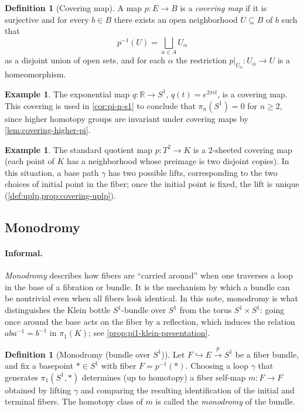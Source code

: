 \documentclass[11pt,a4paper]{article}
\theoremstyle{definition}
\newtheorem{definition}[theorem]{Definition}
\newtheorem{example}[theorem]{Example}
\theoremstyle{remark}
\begin{document}
\begin{definition}[Covering map]
\label{def:covering-map}
A map \(p:E\to B\) is a \emph{covering map} if it is surjective and for every \(b\in B\) there exists an open neighborhood \(U\subseteq B\) of \(b\) such that
\[
p^{-1}(U)=\bigsqcup_{\alpha\in A} U_\alpha
\]
as a disjoint union of open sets, and for each \(\alpha\) the restriction \(p|_{U_\alpha}:U_\alpha\to U\) is a homeomorphism.
\end{definition}

\begin{example}
\label{ex:covering-circle}
The exponential map \(q:\mathbb{R}\to S^1\), \(q(t)=e^{2\pi i t}\), is a covering map. This covering is used in \cref{cor:pi-n-s1} to conclude that \(\pi_n(S^1)=0\) for \(n\ge 2\), since higher homotopy groups are invariant under covering maps by \cref{lem:covering-higher-pi}.
\end{example}

\begin{example}
\label{ex:covering-torus-klein}
The standard quotient map \(p:T^2\to K\) is a \(2\)-sheeted covering map (each point of \(K\) has a neighborhood whose preimage is two disjoint copies). In this situation, a base path \(\gamma\) has two possible lifts, corresponding to the two choices of initial point in the fiber; once the initial point is fixed, the lift is unique (\cref{def:uplp,prop:covering-uplp}).
\end{example}

\subsection{Monodromy}
\label{sec:dict-monodromy}

\paragraph{Informal.}
\emph{Monodromy} describes how fibers are ``carried around'' when one traverses a loop in the base of a fibration or bundle. It is the mechanism by which a bundle can be nontrivial even when all fibers look identical. In this note, monodromy is what distinguishes the Klein bottle \(S^1\)-bundle over \(S^1\) from the torus \(S^1\times S^1\): going once around the base acts on the fiber by a reflection, which induces the relation \(aba^{-1}=b^{-1}\) in \(\pi_1(K)\); see \cref{prop:pi1-klein-presentation}.

\begin{definition}[Monodromy (bundle over \(S^1\))]
\label{def:monodromy}
Let \(F\hookrightarrow E\xrightarrow{p} S^1\) be a fiber bundle, and fix a basepoint \(*\in S^1\) with fiber \(F=p^{-1}(*)\). Choosing a loop \(\gamma\) that generates \(\pi_1(S^1,*)\) determines (up to homotopy) a fiber self-map \(m:F\to F\) obtained by lifting \(\gamma\) and comparing the resulting identification of the initial and terminal fibers. The homotopy class of \(m\) is called the \emph{monodromy} of the bundle.
\end{definition}
\end{document}
